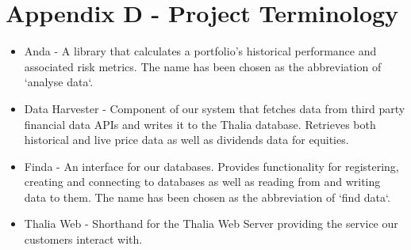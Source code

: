 \documentclass[main.tex]{subfiles}
\begin{document}
\section{Appendix D - Project Terminology}
\begin{itemize}
    \item Anda - A library that calculates a portfolio's historical performance and associated risk metrics. The name has been chosen as the abbreviation of `analyse data`.
    \item Data Harvester - Component of our system that fetches data from third party financial data APIs and writes it to the Thalia database. Retrieves both historical and live price data as well as dividends data for equities.
    \item Finda - An interface for our databases. Provides functionality for registering, creating and connecting to databases as well as reading from and writing data to them. The name has been chosen as the abbreviation of `find data`.
    \item Thalia Web - Shorthand for the Thalia Web Server providing the service our customers interact with.
\end{itemize}
\end{document}
